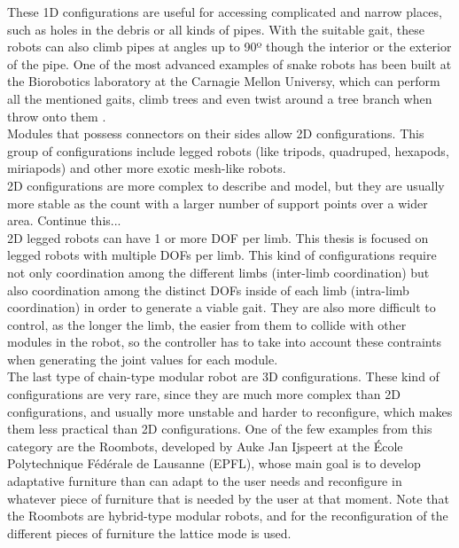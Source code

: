These 1D configurations are useful for accessing complicated and narrow places, such as holes in the debris or all kinds of pipes. With the suitable gait, these robots can also climb pipes at angles up to 90º though the interior or the exterior of the pipe. One of the most advanced examples of snake robots has been built at the Biorobotics laboratory at the Carnagie Mellon Universy, which can perform all the mentioned gaits, climb trees and even twist around a tree branch when throw onto them \cite{}.\\


Modules that possess connectors on their sides allow 2D configurations. This group of configurations include legged robots (like tripods, quadruped, hexapods, miriapods) and other more exotic mesh-like robots.\\

2D configurations are more complex to describe and model, but they are usually more stable as the count with a larger number of support points over a wider area. {\color{red} Continue this...}\\

2D legged robots can have 1 or more DOF per limb. This thesis is focused on legged robots with multiple DOFs per limb. This kind of configurations require not only coordination among the different limbs (inter-limb coordination) but also coordination among the distinct DOFs inside of each limb (intra-limb coordination) in order to generate a viable gait. They are also more difficult to control, as the longer the limb, the easier from them to collide with other modules in the robot, so the controller has to take into account these contraints when generating the joint values for each module.\\

The last type of chain-type modular robot are 3D configurations. These kind of configurations are very rare, since they are much more complex than 2D configurations, and usually more unstable and harder to reconfigure, which makes them less practical than 2D configurations. One of the few examples from this category are the Roombots, developed by Auke Jan Ijspeert at the École Polytechnique Fédérale de Lausanne (EPFL)\cite{}, whose main goal is to develop adaptative furniture than can adapt to the user needs and reconfigure in whatever piece of furniture that is needed by the user at that moment. Note that the Roombots are hybrid-type modular robots, and for the reconfiguration of the different pieces of furniture the lattice mode is used.\\

